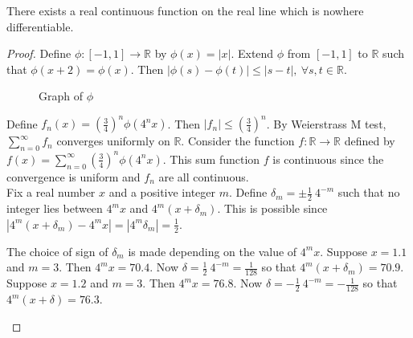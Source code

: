 \begin{theorem} %
	There exists a real continuous function on the real line which is nowhere differentiable.
\end{theorem}
\begin{proof}
	Define $\phi : [-1,1] \to \mathbb{R}$ by $\phi(x) = |x|$.
	Extend $\phi$ from $[-1,1]$ to $\mathbb{R}$ such that $\phi(x+2) = \phi(x)$.
	Then $|\phi(s)-\phi(t)| \le |s-t|,\ \forall s,t \in \mathbb{R}$.\\

\begin{figure}[h]
	\caption{Graph of $\phi$}
\end{figure}

	Define $f_n(x) = \left(\frac{3}{4}\right)^n \phi(4^n x)$.
	Then $|f_n| \le \left(\frac{3}{4}\right)^n$.
	By Weierstrass M test, $\displaystyle \sum_{n = 0}^\infty f_n$ converges uniformly on $\mathbb{R}$.
	Consider the function $f : \mathbb{R} \to \mathbb{R}$ defined by $\displaystyle f(x) = \sum_{n = 0}^\infty \left(\frac{3}{4}\right)^n \phi(4^n x)$.
	This sum function $f$ is continuous since the convergence is uniform and $f_n$ are all continuous.\\

	Fix a real number $x$ and a positive integer $m$.
	Define $\displaystyle \delta_m = \pm \frac{1}{2}\ 4^{-m}$ such that no integer lies between $4^m x$ and $4^m(x+\delta_m)$.
	This is possible since $|4^m (x+\delta_m) - 4^m x| = |4^m \delta_m| = \frac{1}{2}$.\\

	\begin{commentary}
		The choice of sign of $\delta_m$ is made depending on the value of $4^m x$.
		Suppose $x = 1.1$ and $m = 3$.
		Then $4^m x = 70.4$.
		Now $\delta = \frac{1}{2}\ 4^{-m} = \frac{1}{128}$ so that $4^m(x+\delta_m)= 70.9$.
		Suppose $x = 1.2$ and $m = 3$.
		Then $4^m x = 76.8$.
		Now $\delta = -\frac{1}{2}\ 4^{-m} = -\frac{1}{128}$ so that $4^m(x+\delta) = 76.3$.\\
	\end{commentary}


\end{proof}
